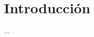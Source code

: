 \documentclass[../main.tex]{subfiles}
\begin{document}
\section{Introducción}%

\thispagestyle{fancy}
...
\end{document}
